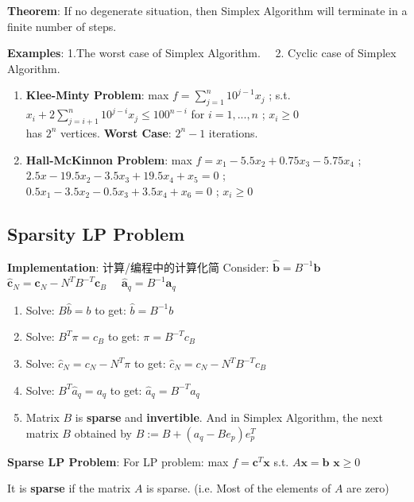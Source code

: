 \documentclass[9pt]{article}
\begin{document}
\quad \textbf{Theorem}: If no degenerate situation, then Simplex Algorithm will terminate in a finite number of steps.

\textbf{Examples}: 1.The worst case of Simplex Algorithm. \ \ 2. Cyclic case of Simplex Algorithm.

\begin{enumerate}[itemsep=-2pt, topsep=-2pt]
    \item \textbf{Klee-Minty Problem}: max $f=\sum^n_{j=1}10^{j-1}x_j$ \quad ; \quad s.t. $x_i+2\sum^n_{j=i+1}10^{j-i}x_j\leq100^{n-i}$ for $i=1,...,n$ \quad ; \quad $x_i\geq0$ \\
    has $2^n$ vertices. \quad \textbf{Worst Case}: $2^n-1$ iterations.
    \item \textbf{Hall-McKinnon Problem}: max $f=x_1-5.5x_2+0.75x_3-5.75x_4$ \quad ;  {\tiny $2.5x-19.5x_2-3.5x_3+19.5x_4+x_5=0$ ; $0.5x_1-3.5x_2-0.5x_3+3.5x_4+x_6=0$ ; $x_i\geq0$}
\end{enumerate}


\subsection{Sparsity LP Problem}

\textbf{Implementation}: 计算/编程中的计算化简 \qquad Consider: $\widehat{\mathbf{b}}=B^{-1}\mathbf{b}$ \ \ $\widehat{\mathbf{c}}_N=\mathbf{c}_N-N^TB^{-T}\mathbf{c}_B$ \ \ $\widehat{\mathbf{a}}_q=B^{-1}\mathbf{a}_q$

\begin{enumerate}[itemsep=-2pt, topsep=-2pt]
    \item Solve: \( B \hat{b} = b \) \quad to get: \(\hat{b} = B^{-1}b\)
    \item Solve: \( B^T \pi = c_B \) \quad to get: \(\pi = B^{-T}c_B\)
    \item Solve: \(\hat{c}_N = c_N - N^T\pi\) \quad to get: \(\hat{c}_N = c_N - N^TB^{-T}c_B\)
    \item Solve: \( B^T \hat{a}_q = a_q \) \quad to get: \(\hat{a}_q = B^{-T}a_q\)
    \item Matrix $B$ is \textbf{sparse} and \textbf{invertible}. And in Simplex Algorithm, the next matrix $B$ obtained by $B := B + (a_q - B e_p) e_p^T$
\end{enumerate}

\textbf{Sparse LP Problem}: For LP problem: max $f=\mathbf{c}^T\mathbf{x}$ \quad s.t. $A\mathbf{x}=\mathbf{b}$ \quad $\mathbf{x}\geq0$

\qquad It is \textbf{sparse} if the matrix $A$ is sparse. (i.e. Most of the elements of $A$ are zero)
\end{document}
